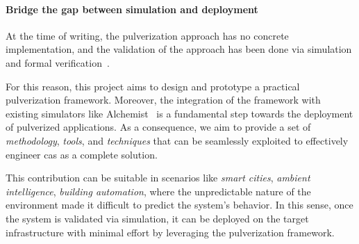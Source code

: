 \documentclass[12pt,a4paper]{article}
\begin{document}
\paragraph{Bridge the gap between simulation and deployment}\label{sec:bridge-gap}

At the time of writing,
the pulverization approach has no concrete implementation,
and the validation of the approach has been done via simulation and formal verification~\cite{DBLP:journals/fi/CasadeiPPVW20, DBLP:journals/iotj/CasadeiFPPSV22}.

For this reason,
this project aims to design and prototype a practical pulverization framework.
%
Moreover,
the integration of the framework with existing simulators like Alchemist~\cite{DBLP:journals/jos/PianiniMV13} is a fundamental step towards the deployment of pulverized applications.
%
As a consequence,
we aim to provide a set of \emph{methodology},
\emph{tools},
and \emph{techniques} that can be seamlessly exploited to effectively engineer \ac{cas} as a complete solution.

This contribution can be suitable in scenarios like \emph{smart cities},
\emph{ambient intelligence},
\emph{building automation},
where the unpredictable nature of the environment made it difficult to predict the system's behavior.
%
In this sense, once the system is validated via simulation,
it can be deployed on the target infrastructure with minimal effort by leveraging the pulverization framework.
\end{document}
